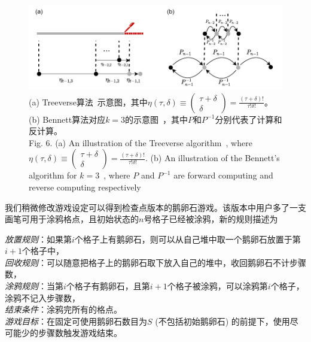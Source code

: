 \documentclass[A4,twoside,UTF8]{ctexart}
\begin{document}
\begin{figure}
    \centerline{\includegraphics[width=0.88\columnwidth,trim={0 0cm 0 0cm},clip]{tradeoff2.pdf}}
    \caption{
        (a) Treeverse算法~\cite{Griewank1992}示意图，其中$\eta(\tau, \delta) \equiv \left(\begin{matrix} \tau + \delta \\ \delta \end{matrix}\right)=\frac{(\tau+\delta)!}{\tau!\delta!}$。(b) Bennett算法对应$k=3$的示意图~\cite{Bennett1973,Levine1990}，其中$P$和$P^{-1}$分别代表了计算和反计算。\\
        Fig. 6. (a) An illustration of the Treeverse algorithm~\cite{Griewank1992}, where $\eta(\tau, \delta) \equiv \left(\begin{matrix} \tau + \delta \\ \delta \end{matrix}\right)=\frac{(\tau+\delta)!}{\tau!\delta!}$.
        (b) An illustration of the Bennett's algorithm for $k=3$~\cite{Bennett1973,Levine1990}, where $P$ and $P^{-1}$ are forward computing and reverse computing respectively\\
        }\label{fig:tradeoff}
\end{figure}


我们稍微修改游戏设定可以得到检查点版本的鹅卵石游戏。该版本中用户多了一支画笔可用于涂鸦格点，且初始状态的$n$号格子已经被涂鸦，新的规则描述为
\begin{tcolorbox}[width=\textwidth, title=鹅卵石游戏-检查点版本]
    \textit{放置规则}：如果第$i$个格子上有鹅卵石，则可以从自己堆中取一个鹅卵石放置于第$i+1$个格子中，\\
    \textit{回收规则}：可以随意把格子上的鹅卵石取下放入自己的堆中，收回鹅卵石不计步骤数，\\
    \textit{涂鸦规则}：当第$i$个格子有鹅卵石，且第$i+1$个格子被涂鸦，可以涂鸦第$i$个格子，涂鸦不记入步骤数，\\
    \textit{结束条件}：涂鸦完所有的格点。\\
    \textit{游戏目标}：在固定可使用鹅卵石数目为$S$ (不包括初始鹅卵石) 的前提下，使用尽可能少的步骤数触发游戏结束。
\end{tcolorbox}
\end{document}
